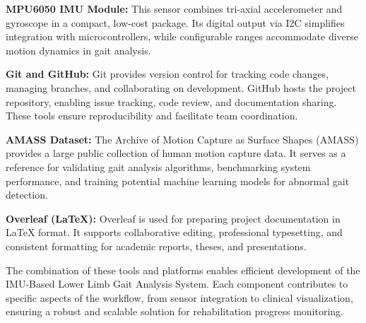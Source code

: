 \documentclass[12pt,a4paper]{report}
\begin{document}
\vspace{0.4cm}

\textbf{MPU6050 IMU Module:}  
This sensor combines tri-axial accelerometer and gyroscope in a compact, low-cost package. Its digital output via I2C simplifies integration with microcontrollers, while configurable ranges accommodate diverse motion dynamics in gait analysis.

\vspace{0.4cm}

\textbf{Git and GitHub:}  
Git provides version control for tracking code changes, managing branches, and collaborating on development. GitHub hosts the project repository, enabling issue tracking, code review, and documentation sharing. These tools ensure reproducibility and facilitate team coordination.

\vspace{0.4cm}

\textbf{AMASS Dataset:}  
The Archive of Motion Capture as Surface Shapes (AMASS) provides a large public collection of human motion capture data. It serves as a reference for validating gait analysis algorithms, benchmarking system performance, and training potential machine learning models for abnormal gait detection.

\vspace{0.4cm}

\textbf{Overleaf (LaTeX):}  
Overleaf is used for preparing project documentation in LaTeX format. It supports collaborative editing, professional typesetting, and consistent formatting for academic reports, theses, and presentations.

The combination of these tools and platforms enables efficient development of the IMU-Based Lower Limb Gait Analysis System. Each component contributes to specific aspects of the workflow, from sensor integration to clinical visualization, ensuring a robust and scalable solution for rehabilitation progress monitoring.

\setcounter{chapter}{4}
\clearpage
\thispagestyle{empty}

\noindent
{}

\clearpage
{}
\setcounter{section}{0}
\end{document}
